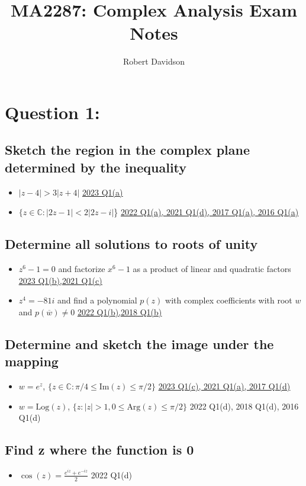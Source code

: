 \documentclass[a4paper, 8pt]{extarticle}
\title{
\textbf{MA2287: Complex Analysis Exam Notes} \\ 
}
\author{
  Robert Davidson
}
\date{} %
\begin{document}
\maketitle
\pagebreak
\tableofcontents
\pagebreak


\section{Question 1: }
\subsection{Sketch the region in the complex plane determined by the inequality}
\begin{itemize}
    \item $|z - 4| > 3|z+4|$ \hfill \hyperref[sol:2023Q1a]{\uline{2023 Q1(a)}}
    \item $\{ z \in \mathbb{C} : |2z - 1| < 2|2z-i|$\} \hfill  \hyperref[sol:2022Q1a]{\uline{2022 Q1(a), 2021 Q1(d), 2017 Q1(a), 2016 Q1(a)}}
\end{itemize}
\subsection{Determine all solutions to roots of unity}
\begin{itemize}
    \item $z^6 -1 = 0$ and factorize $x^6 -1$ as a product of linear and quadratic factors \hfill \hyperref[sol:2023Q1b]{\uline{2023 Q1(b),2021 Q1(c)}}
    \item $z^4 = -81i$ and find a polynomial $p(z)$ with complex coefficients with root $w$ and $p(\overline{w}) \neq 0$ \hfill \hyperref[sol:20188Q1b]{\uline{2022 Q1(b),2018 Q1(b)}}

\end{itemize}
\subsection{Determine and sketch the image under the mapping}
\begin{itemize}
    \item $w = e^z$, $\{z \in \mathbb{C} : \pi / 4 \leq \text{Im}(z) \leq \pi /2\}$ \hfill \hyperref[sol:20231Q1c]{\uline{2023 Q1(c), 2021 Q1(a), 2017 Q1(d)}}
    \item $w = \text{Log}(z)$, $\{z: |z| > 1, 0 \leq \text{Arg}(z) \leq \pi / 2\}$ \hfill 2022 Q1(d), 2018 Q1(d), 2016 Q1(d)
\end{itemize}
\subsection{Find z where the function is 0}
\begin{itemize}
    \item $\cos(z) = \frac{e^{iz} + e^{-iz}}{2}$ \hfill 2022 Q1(d)
\end{itemize}
\end{document}
